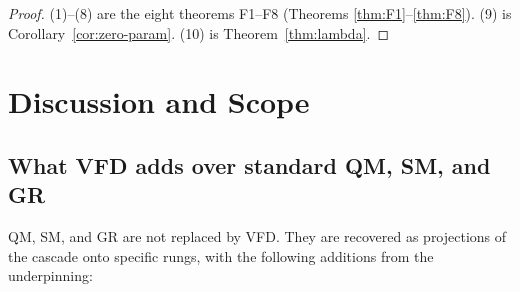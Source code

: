 \documentclass[12pt]{article}
\theoremstyle{definition}
\theoremstyle{remark}
\begin{document}
\begin{proof}
(1)--(8) are the eight theorems F1--F8 (Theorems \ref{thm:F1}--\ref{thm:F8}). (9) is Corollary~\ref{cor:zero-param}. (10) is Theorem~\ref{thm:lambda}.
\end{proof}

\section{Discussion and Scope}\label{sec:discussion}

\subsection{What VFD adds over standard QM, SM, and GR}

QM, SM, and GR are not replaced by VFD. They are recovered as projections of the cascade onto specific rungs, with the following additions from the underpinning:
\end{document}
